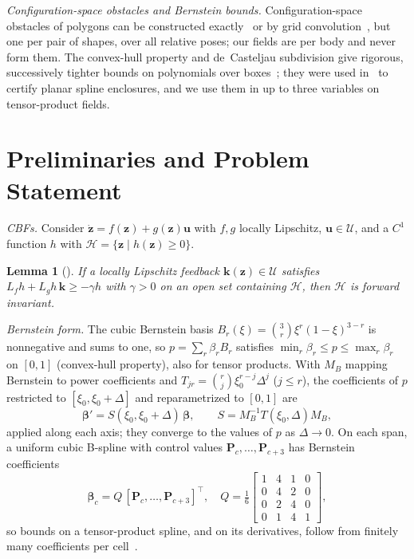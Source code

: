 \documentclass[journal]{IEEEtran}
\newtheorem{lemma}{Lemma}
\theoremstyle{definition}
\begin{document}
\emph{Configuration-space obstacles and Bernstein bounds.} Configuration-space obstacles of polygons
can be constructed exactly~\cite{lozanoperez1983spatial,latombe1991robot} or by grid
convolution~\cite{kavraki1995fft}, but one per pair of shapes, over all relative poses; our fields
are per body and never form them. The
convex-hull property and de~Casteljau subdivision give rigorous, successively tighter bounds on
polynomials over boxes~\cite{farin2002curves,sherbrooke1993computation}; they were used
in~\cite{jo2027semantic} to certify planar spline enclosures, and we use them in up to three
variables on tensor-product fields.

\section{Preliminaries and Problem Statement}\label{sec:prelim}

\emph{CBFs.} Consider $\dot{\mathbf z}=f(\mathbf z)+g(\mathbf z)\mathbf u$ with $f,g$ locally
Lipschitz, $\mathbf u\in\mathcal U$, and a $C^1$ function $h$ with
$\mathcal H=\{\mathbf z\mid h(\mathbf z)\ge0\}$.
\begin{lemma}[\cite{ames2019cbf}]\label{lem:cbf}
If a locally Lipschitz feedback $\mathbf k(\mathbf z)\in\mathcal U$ satisfies
$L_fh+L_gh\,\mathbf k\ge-\gamma h$ with $\gamma>0$ on an open set containing $\mathcal H$, then
$\mathcal H$ is forward invariant.
\end{lemma}

\emph{Bernstein form.} The cubic Bernstein basis $B_r(\xi)=\binom3r\xi^r(1-\xi)^{3-r}$ is
nonnegative and sums to one, so $p=\sum_r\beta_rB_r$ satisfies $\min_r\beta_r\le p\le\max_r\beta_r$
on $[0,1]$ (convex-hull property), also for tensor products. With $M_B$ mapping Bernstein to power
coefficients and $T_{jr}=\binom rj\xi_0^{r-j}\Delta^j$ ($j\le r$), the coefficients of $p$ restricted
to $[\xi_0,\xi_0+\Delta]$ and reparametrized to $[0,1]$ are
\begin{equation}\label{eq:subdiv}
\boldsymbol\beta'=S(\xi_0,\xi_0+\Delta)\,\boldsymbol\beta,\qquad S=M_B^{-1}T(\xi_0,\Delta)M_B,
\end{equation}
applied along each axis; they converge to the values of $p$ as $\Delta\to0$. On each span, a uniform
cubic B-spline with control values $\mathbf P_c,\dots,\mathbf P_{c+3}$ has Bernstein coefficients
\begin{equation}\label{eq:b2b}
\boldsymbol\beta_c=Q\,[\mathbf P_{c},\dots,\mathbf P_{c+3}]^{\top},\quad
Q=\tfrac16\left[\begin{smallmatrix}1&4&1&0\\0&4&2&0\\0&2&4&0\\0&1&4&1\end{smallmatrix}\right],
\end{equation}
so bounds on a tensor-product spline, and on its derivatives, follow from finitely many
coefficients per cell~\cite{farin2002curves,jo2027semantic}.
\end{document}
